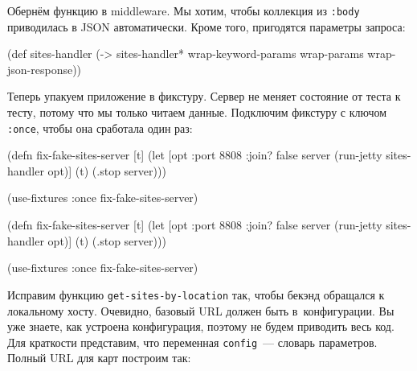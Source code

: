 \fi


Обернём функцию в middleware. Мы хотим, чтобы коллекция из \verb|:body|
приводилась в JSON автоматически. Кроме того, пригодятся параметры запроса:

\begin{english}
  \begin{clojure}
(def sites-handler
  (-> sites-handler*
      wrap-keyword-params
      wrap-params
      wrap-json-response))
  \end{clojure}
\end{english}

Теперь упакуем приложение в фикстуру. Сервер не меняет состояние от теста к
тесту, потому что мы только читаем данные. Подключим фикстуру с ключом
\verb|:once|, чтобы она сработала один раз:

\ifnarrow

\begin{english}
  \begin{clojure}
(defn fix-fake-sites-server [t]
  (let [opt {:port 8808 :join? false}
        server (run-jetty
                 sites-handler opt)]
    (t)
    (.stop server)))

(use-fixtures :once
  fix-fake-sites-server)
  \end{clojure}
\end{english}

\else

\begin{english}
  \begin{clojure}
(defn fix-fake-sites-server [t]
  (let [opt {:port 8808 :join? false}
        server (run-jetty sites-handler opt)]
    (t)
    (.stop server)))

(use-fixtures :once fix-fake-sites-server)
  \end{clojure}
\end{english}

\fi


Исправим функцию \verb|get-sites-by-location| так, чтобы бекэнд обращался к
локальному хосту. Очевидно, базовый URL должен быть в~конфигурации. Вы уже
знаете, как устроена конфигурация, поэтому не будем приводить весь код. Для
краткости представим, что переменная \verb|config|~--- словарь
параметров. Полный URL для карт построим так:

\pagebreaklarge

\ifnarrow

